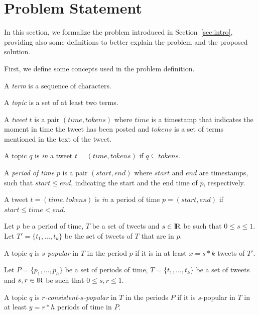 \section{Problem Statement}
\label{sec:ps}
In this section, we formalize the problem introduced in Section~\ref{sec:intro}, 
providing also some definitions to better explain the problem and the proposed solution.

First, we define some concepts used in the problem definition.
\begin{definition}
    A \emph{term} is a sequence of characters.
\end{definition}
\begin{definition}
    A \emph{topic} is a set of at least two terms.
\end{definition}
\begin{definition}
    A \emph{tweet} $t$ is a pair $(\mathit{time}, \mathit{tokens})$ where
    $\mathit{time}$ is a timestamp that indicates the moment in time the 
    tweet has been posted and $\mathit{tokens}$ is a set of terms mentioned
    in the text of the tweet.
\end{definition}
\begin{definition}
    A topic $q$ is \emph{in} a tweet $t = (\mathit{time}, \mathit{tokens})$ if 
    $\mathit{q} \subseteq \mathit{tokens}$.
\end{definition}
\begin{definition}
    A \emph{period of time} $p$ is a pair $(\mathit{start}, \mathit{end})$ where
    $\mathit{start}$ and $\mathit{end}$ are timestamps, such that 
    $\mathit{start} \leq \mathit{end}$, indicating the start and 
    the end time of $p$, respectively.
\end{definition}
\begin{definition}
    A tweet $t = (\mathit{time}, \mathit{tokens})$ is \emph{in} a period of 
    time $p = (\mathit{start}, \mathit{end})$ if 
    $\mathit{start} \leq time < \mathit{end}$.
\end{definition}
\begin{definition}
   Let $p$ be a period of time, $T$ be a set of tweets and $s \in \rm I\!R$ be
   such that $0 \leq s \leq 1$.
    Let
   $T' = \{t_1, \dots, t_k\}$ be the set of tweets of $T$ that are in $p$. 

   A topic $q$ is $s$\emph{-popular} in $T$ in the period $p$ if it is in at least
   $x = s * k$ tweets of $T'$.
\end{definition}
\begin{definition}
    Let $P = \{p_1, \dots, p_h\}$ be a set of periods of time, 
    $T = \{t_1, \dots, t_k\}$ be a set of tweets and
    $s, r \in \rm I\!R$ be such that $0 \leq s, r \leq 1$.

    A topic $q$ is $r$\emph{-consistent-}$s$\emph{-popular} in $T$ in the periods $P$ 
    if it is $s$-popular in $T$ in at least $y = r * h$ periods of time in $P$.
 \end{definition}

